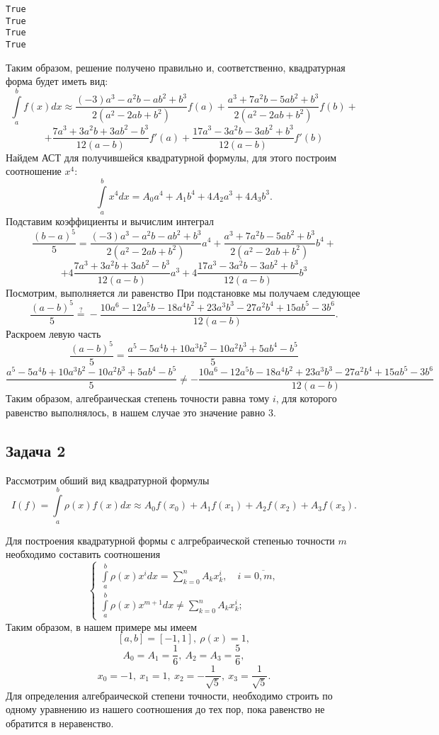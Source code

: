 \documentclass[11pt]{article}
\begin{document}
    \begin{Verbatim}[commandchars=\\\{\}]
True
True
True
True
    \end{Verbatim}

    Таким образом, решение получено правильно и, соответственно,
квадратурная форма будет иметь вид:
$$\int\limits_a^b f(x)dx \approx \frac{(-3) a^3 - a^2b-ab^2+b^3}{2(a^2-2ab+b^2)} f(a) + \frac{a^3+7a^2b-5ab^2+b^3}{2(a^2-2ab+b^2)} f(b) + $$
$$+\frac{7a^3+3a^2b+3ab^2-b^3}{12(a-b)} f'(a) + \frac{17a^3-3a^2b-3ab^2+b^3}{12(a-b)} f'(b)$$
Найдем АСТ для получившейся квадратурной формулы, для этого построим
соотношение \(x^4:\)
\[\int\limits_a^b x^4 dx = A_0a^4 + A_1b^4 + 4A_2a^3 + 4A_3b^3.\]
Подставим коэффициенты и вычислим интеграл
$$\frac{(b-a)^5}{5} = \frac{(-3) a^3 - a^2b-ab^2+b^3}{2(a^2-2ab+b^2)} a^4 + \frac{a^3+7a^2b-5ab^2+b^3}{2(a^2-2ab+b^2)} b^4 + $$
$$+4 \frac{7a^3+3a^2b+3ab^2-b^3}{12(a-b)} a^3 + 4\frac{17a^3-3a^2b-3ab^2+b^3}{12(a-b)} b^3$$
Посмотрим, выполняется ли равенство
    При подстановке мы получаем следующее
\[\frac{(a-b)^5}{5} \overset{?}{=} -\frac{10a^6-12a^5b-18a^4b^2+23a^3b^3-27a^2b^4+15ab^5-3b^6}{12(a-b)}.\]
Раскроем левую часть
\[\frac{(a-b)^5}{5} = \frac{a^5-5a^4b+10a^3b^2-10a^2b^3+5ab^4-b^5}{5}\]
\[\frac{a^5-5a^4b+10a^3b^2-10a^2b^3+5ab^4-b^5}{5} \neq -\frac{10a^6-12a^5b-18a^4b^2+23a^3b^3-27a^2b^4+15ab^5-3b^6}{12(a-b)}\]
Таким образом, алгебраическая степень точности равна тому $i$, для которого равенство выполнялось, в нашем случае это значение равно 3.

    \subsection*{Задача 2}

Рассмотрим обший вид квадратурной формулы
\[I(f) = \int\limits_a^b \rho(x)f(x)dx \approx A_0 f(x_0) + A_1 f(x_1) + A_2 f(x_2) + A_3 f(x_3).\]

Для построения квадратурной формы с алгребраической степенью точности
\(m\) необходимо составить соотношения 
$$\begin{cases}
\int\limits_a^b \rho(x) x^idx = \sum\limits_{k=0}^{n}A_kx^i_k,\quad i=\overline{0,m},\\
\int\limits_a^b \rho(x) x^{m+1}dx \ne \sum\limits_{k=0}^{n}A_kx^i_k;
\end{cases}$$
Таким образом, в нашем примере мы имеем
\[[a, b] = [-1, 1], \ \rho(x) = 1,\]
\[A_0 = A_1 = \frac{1}{6},\  A_2 = A_3 = \frac{5}{6},\]
\[x_0 = -1, \ x_1 = 1, \ x_2 = -\frac{1}{\sqrt{5}},\  x_3 = \frac{1}{\sqrt{5}}.\]
Для определения алгебраической степени точности, необходимо строить по
одному уравнению из нашего соотношения до тех пор, пока равенство не
обратится в неравенство.
\end{document}
